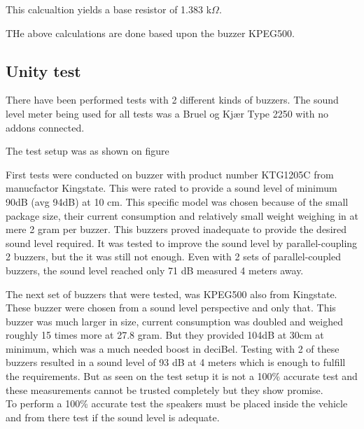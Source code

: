 This calcualtion yields a base resistor of 1.383 k$\Omega$.

THe above calculations are done based upon the buzzer KPEG500.

\subsection{Unity test}
There have been performed tests with 2 different kinds of buzzers. The sound level meter being used for all tests was a Bruel og Kjær Type 2250  with no addons connected.

The test setup was as shown on figure

First tests were conducted on buzzer with product number KTG1205C from manucfactor Kingstate. This were rated to provide a sound level of minimum 90dB (avg 94dB) at 10 cm. This specific model was chosen because of the small package size, their current consumption and relatively small weight weighing in at mere 2 gram per buzzer. This buzzers proved inadequate to provide the desired sound level required. It was tested to improve the sound level by parallel-coupling 2 buzzers, but the it was still not enough. Even with 2 sets of parallel-coupled buzzers, the sound level reached only 71 dB measured 4 meters away.

The next set of buzzers that were tested, was KPEG500 also from Kingstate. These buzzer were chosen from a sound level perspective and only that. This buzzer was much larger in size, current consumption was doubled and weighed roughly 15 times more at 27.8 gram. But they provided 104dB at 30cm at minimum, which was a much needed boost in deciBel. Testing with 2 of these buzzers resulted in a sound  level of 93 dB at 4 meters which is enough to fulfill the requirements. But as seen on the test setup it is not a 100\% accurate test and these measurements cannot be trusted completely but they show promise. \\
To perform a 100\% accurate test the speakers must be placed inside the vehicle and from there test if the sound level is adequate.

